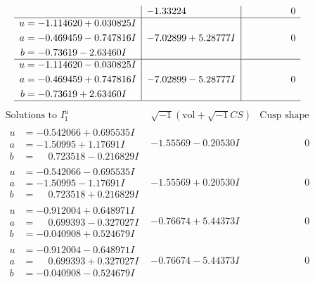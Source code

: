 \documentclass[1p]{elsarticle_modified}
\theoremstyle{definition}
\newcommand{\I}{\sqrt{-1}}
\begin{document}
$$\begin{array}{c|c|c}
 & -1.33224\phantom{ +0.000000I} & \phantom{-0.000000 } 0 \\ \hline\begin{aligned}
u &= -1.114620 + 0.030825 I \\
a &= -0.469459 - 0.747816 I \\
b &= -0.73619 - 2.63460 I\end{aligned}
 & -7.02899 + 5.28777 I & \phantom{-0.000000 } 0 \\ \hline\begin{aligned}
u &= -1.114620 - 0.030825 I \\
a &= -0.469459 + 0.747816 I \\
b &= -0.73619 + 2.63460 I\end{aligned}
 & -7.02899 - 5.28777 I & \phantom{-0.000000 } 0\\
 \hline 
 \end{array}$$\newpage$$\begin{array}{c|c|c}  
\text{Solutions to }I^u_{1}& \I (\text{vol} + \sqrt{-1}CS) & \text{Cusp shape}\\
 \hline 
\begin{aligned}
u &= -0.542066 + 0.695535 I \\
a &= -1.50995 + 1.17691 I \\
b &= \phantom{-}0.723518 - 0.216829 I\end{aligned}
 & -1.55569 - 0.20530 I & \phantom{-0.000000 } 0 \\ \hline\begin{aligned}
u &= -0.542066 - 0.695535 I \\
a &= -1.50995 - 1.17691 I \\
b &= \phantom{-}0.723518 + 0.216829 I\end{aligned}
 & -1.55569 + 0.20530 I & \phantom{-0.000000 } 0 \\ \hline\begin{aligned}
u &= -0.912004 + 0.648971 I \\
a &= \phantom{-}0.699393 - 0.327027 I \\
b &= -0.040908 + 0.524679 I\end{aligned}
 & -0.76674 + 5.44373 I & \phantom{-0.000000 } 0 \\ \hline\begin{aligned}
u &= -0.912004 - 0.648971 I \\
a &= \phantom{-}0.699393 + 0.327027 I \\
b &= -0.040908 - 0.524679 I\end{aligned}
 & -0.76674 - 5.44373 I & \phantom{-0.000000 } 0 \\ \hline\begin{aligned}

\end{aligned}
\end{array}$$
\end{document}
